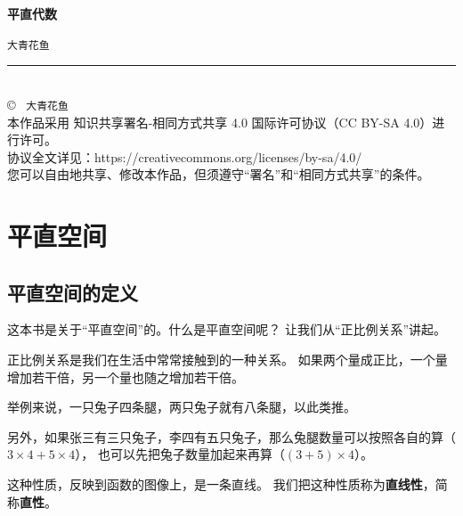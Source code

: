 \documentclass[12pt,UTF8,fontset=none]{ctexbook}
\newcommand{\mytitle}{平直代数}
\newcommand{\myauthor}{大青花鱼}
\begin{document}
\cleardoublepage                %
\thispagestyle{empty}           %
\begin{center}
    \vspace*{2cm}               %
    
    { \bfseries \mytitle}
    
    \vspace{1cm}              %
    
    { \texttt{\myauthor}}
    
    \vfill                      %
    
    \rule{0.5\textwidth}{0.4pt} \\[0.5cm]
    
    {\scriptsize
    \copyright\ \the\year{} \texttt{\myauthor} \\[0.2cm]
    本作品采用 知识共享署名-相同方式共享 4.0 国际许可协议（CC BY-SA 4.0）进行许可。\\
    协议全文详见：https://creativecommons.org/licenses/by-sa/4.0/ \\
    您可以自由地共享、修改本作品，但须遵守“署名”和“相同方式共享”的条件。
    }
\end{center}
\newpage   

\tableofcontents
\newpage

\chapter{平直空间}
\section{平直空间的定义}
这本书是关于“平直空间”的。什么是平直空间呢？
让我们从“正比例关系”讲起。

正比例关系是我们在生活中常常接触到的一种关系。
如果两个量成正比，一个量增加若干倍，另一个量也随之增加若干倍。

举例来说，一只兔子四条腿，两只兔子就有八条腿，以此类推。

另外，如果张三有三只兔子，李四有五只兔子，那么兔腿数量可以按照各自的算（$3\times4 +5\times4$），
也可以先把兔子数量加起来再算（$(3+5)\times4$）。

这种性质，反映到函数的图像上，是一条直线。
我们把这种性质称为\textbf{直线性}，简称\textbf{直性}。
\end{document}
